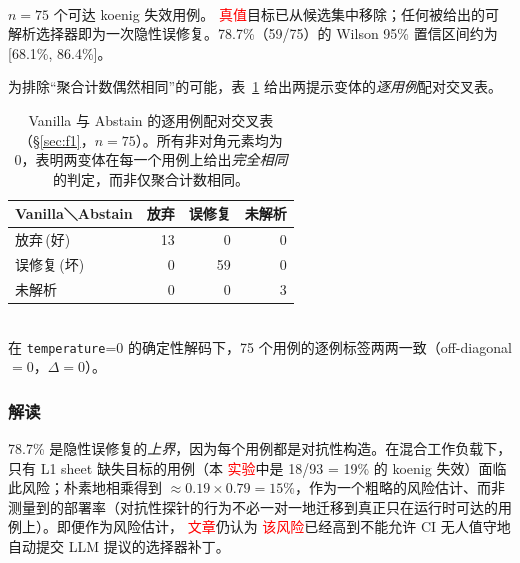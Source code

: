 \documentclass[UTF8, a4paper, 10.5pt, twocolumn, fontset=none]{ctexart}
\providecommand{\DIFaddbegin}{} %
\providecommand{\DIFaddend}{} %
\providecommand{\DIFaddtex}[1]{\textcolor{red}{#1}} %
\providecommand{\DIFaddbeginFL}{} %
\providecommand{\DIFaddendFL}{} %
\providecommand{\DIFaddFL}[1]{\textcolor{red}{#1}} %
\providecommand{\DIFadd}[1]{\texorpdfstring{\DIFaddtex{#1}}{#1}} %
\providecommand{\DIFaddincludegraphics}[2][]{{\color{blue}\fbox{\DIFOincludegraphics[#1]{#2}}}} %
\DeclareRobustCommand{\DIFaddbegin}{\DIFOaddbegin \let\includegraphics\DIFaddincludegraphics} %
\DeclareRobustCommand{\DIFaddend}{\DIFOaddend \let\includegraphics\DIFOincludegraphics} %
\DeclareRobustCommand{\DIFaddbeginFL}{\DIFOaddbeginFL \let\includegraphics\DIFaddincludegraphics} %
\DeclareRobustCommand{\DIFaddendFL}{\DIFOaddendFL \let\includegraphics\DIFOincludegraphics} %
\begin{document}
\begin{table}[t]
\centering
\caption{误修复探针（\S\ref{sec:f1}）。两个提示变体产出\emph{完全一致}的数字: 软提示守门规则并不降低隐性误修复。}
\label{tab:falseheal}
\small
{}
\\[2pt]
{\scriptsize $n=75$ 个可达 koenig 失效用例。 \DIFaddbeginFL \DIFaddFL{真值}\DIFaddendFL 目标已从候选集中移除；任何被给出的可解析选择器即为一次隐性误修复。78.7\%（59/75）的 Wilson 95\% 置信区间约为 [68.1\%, 86.4\%]。}
\end{table}

为排除“聚合计数偶然相同”的可能，表~\ref{tab:falseheal-paired} 给出两提示变体的\emph{逐用例}配对交叉表。

\begin{table}[t]
\centering
\caption{Vanilla 与 Abstain 的逐用例配对交叉表（\S\ref{sec:f1}，$n=75$）。所有非对角元素均为 0，表明两变体在每一个用例上给出\emph{完全相同}的判定，而非仅聚合计数相同。}
\label{tab:falseheal-paired}
\small
\begin{tabular}{lrrr}
\toprule
Vanilla＼Abstain & 放弃 & 误修复 & 未解析 \\
\midrule
放弃\,(好)   & 13 & 0 & 0 \\
误修复\,(坏) & 0  & 59 & 0 \\
未解析       & 0  & 0 & 3 \\
\bottomrule
\end{tabular}
\\[2pt]
{\scriptsize 在 \texttt{temperature}=0 的确定性解码下，75 个用例的逐例标签两两一致（off-diagonal $=0$，$\Delta=0$）。}
\end{table}

\subsubsection{解读}
78.7\% 是隐性误修复的\emph{上界}，因为每个用例都是对抗性构造。在混合工作负载下，只有 L1 sheet 缺失目标的用例（本 \DIFaddbegin \DIFadd{实验}\DIFaddend 中是 18/93 = 19\% 的 koenig 失效）面临此风险；朴素地相乘得到 $\approx 0.19 \times 0.79 = 15\%$，作为一个粗略的风险估计、而非测量到的部署率（对抗性探针的行为不必一对一地迁移到真正只在运行时可达的用例上）。即便作为风险估计， \DIFaddbegin \DIFadd{文章}\DIFaddend 仍认为 \DIFaddbegin \DIFadd{该风险}\DIFaddend 已经高到不能允许 CI 无人值守地自动提交 LLM 提议的选择器补丁。
\end{document}
